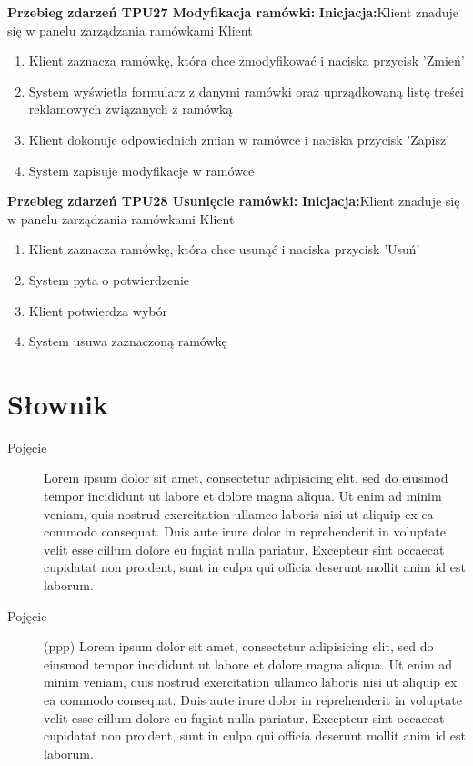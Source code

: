 \documentclass[10pt,a4paper,titlepage]{article} %
\begin{document}
		{\bf Przebieg zdarzeń TPU27 Modyfikacja ramówki:}\newline
		{\bf Inicjacja:}Klient znaduje się w panelu zarządzania ramówkami
		 Klient
			\begin{enumerate}
			  \item Klient zaznacza ramówkę, która chce zmodyfikować i naciska przycisk
			  'Zmień'
			  \item System wyświetla formularz z danymi ramówki oraz uprządkowaną listę
			  treści reklamowych związanych z ramówką
			  \item Klient dokonuje odpowiednich zmian w ramówce i naciska przycisk
			  'Zapisz'
			  \item System zapisuje modyfikacje w ramówce
			\end{enumerate}
			
		{\bf Przebieg zdarzeń TPU28 Usunięcie ramówki:}\newline
		{\bf Inicjacja:}Klient znaduje się w panelu zarządzania ramówkami
		 Klient
			\begin{enumerate}
			  \item Klient zaznacza ramówkę, która chce usunąć i naciska przycisk
			  'Usuń'
			  \item System pyta o potwierdzenie
			  \item Klient potwierdza wybór
			  \item System usuwa zaznaczoną ramówkę
			\end{enumerate}
		
\cleardoublepage

\section*{Słownik}
		
		\begin{description}
			\item[Pojęcie]
				Lorem ipsum dolor sit amet, consectetur adipisicing elit, sed do eiusmod tempor incididunt 
				ut labore et dolore magna aliqua. Ut enim ad 	minim veniam, quis nostrud exercitation 
				ullamco laboris nisi ut aliquip ex ea commodo consequat. Duis aute irure dolor in reprehenderit 
				in voluptate velit esse cillum dolore eu fugiat nulla pariatur. Excepteur sint occaecat 
				cupidatat non proident, sunt in culpa qui officia deserunt mollit anim id est laborum.				
			\item[Pojęcie] (ppp) 
				Lorem ipsum dolor sit amet, consectetur adipisicing elit, sed do eiusmod tempor incididunt 
				ut labore et dolore magna aliqua. Ut enim ad 	minim veniam, quis nostrud exercitation 
				ullamco laboris nisi ut aliquip ex ea commodo consequat. Duis aute irure dolor in reprehenderit 
				in voluptate velit esse cillum dolore eu fugiat nulla pariatur. Excepteur sint occaecat 
				cupidatat non proident, sunt in culpa qui officia deserunt mollit anim id est laborum.
		\end{description}
	
\end{document}
